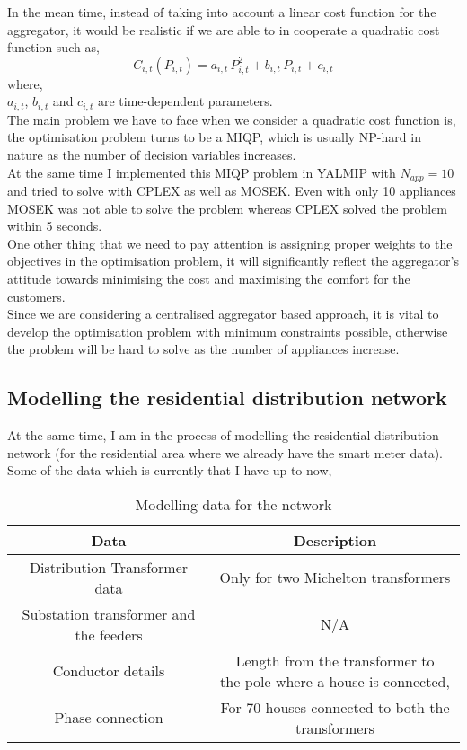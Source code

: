 \documentclass[12pt,a4paper]{article}
\begin{document}
In the mean time, instead of taking into account a linear cost function for the aggregator, it would be realistic if we are able to in cooperate a quadratic cost function such as, \begin{equation*}
    C_{i,t}(P_{i,t})= a_{i,t}\, P_{i,t}^2 + b_{i,t}\,P_{i,t} + c_{i,t}  
\end{equation*}
where,\\
$a_{i,t}$, $b_{i,t}$ and $c_{i,t}$ are time-dependent parameters.\\

The main problem we have to face when we consider a quadratic cost function is, the optimisation problem turns to be a MIQP, which is usually NP-hard in nature as the number of decision variables increases.\\

At the same time I implemented this MIQP problem in YALMIP with $N_{app}=10$ and tried to solve with CPLEX \cite{cplex} as well as MOSEK. Even with only 10 appliances MOSEK \cite{mosek} was not able to solve the problem whereas CPLEX solved the problem within 5 seconds. \\

One other thing that we need to pay attention is assigning proper weights to the objectives in the optimisation problem, it will significantly reflect the aggregator's attitude towards minimising the cost and maximising the comfort for the customers.\\

Since we are considering a centralised aggregator based approach, it is vital to develop the optimisation problem with minimum constraints possible, otherwise the problem will be hard to solve as the number of appliances increase. 
    
\subsection*{\small Modelling the residential distribution network }

At the same time, I am in the process of modelling the residential distribution network (for the residential area where we already have the smart meter data). Some of the data which is currently that I have up to now,


\begin{table}[h!]
    \centering
    \begin{tabular}{||c c||} 
\hline
 Data & Description  \\ [0.5ex] 
 \hline\hline
 Distribution Transformer data & Only for two Michelton transformers \\ 
 \hline
 Substation transformer and the feeders & N/A  \\
 \hline
 Conductor details &\makecell{Length from the transformer to \\ the pole where a house is connected,}   \\
 \hline
Phase connection & For 70 houses connected to both the transformers \\
 \hline
    \end{tabular}
    \caption{Modelling data for the network}
    \label{tab:OpenDSS_data}
\end{table}
\end{document}

